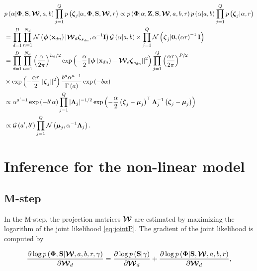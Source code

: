 	\begin{align}
	&p\left(\alpha|\boldsymbol{\Phi},\mathbf{S},\boldsymbol{\mathcal{W}},a,b\right)\prod_{j=1}^{Q}p\left(\boldsymbol{\zeta}_j|\alpha,\boldsymbol{\Phi},\mathbf{S},\boldsymbol{\mathcal{W}},r\right) \propto  p\left(\boldsymbol{\Phi}|\alpha,\boldsymbol{\mathrm{Z}},\mathbf{S},\boldsymbol{\mathcal{W}},a,b,r\right)p\left(\alpha|a,b\right)\prod_{j=1}^{Q}p\left(\boldsymbol{\zeta}_j|\alpha,r\right) \notag\\
	& =  \prod_{d=1}^{D}\prod_{n=1}^{N_d}{\mathcal{N}\left(\boldsymbol{\phi}\left(\mathbf{x}_{dn}\right)|\boldsymbol{\mathcal{W}}_d \boldsymbol{\zeta}_{s_{dn}},\alpha^{-1}\mathbf{I}\right)\mathcal{G}\left(\alpha|a,b\right)} \times \prod_{j=1}^{Q}\mathcal{N}\left(\boldsymbol{\zeta}_j|\mathbf{0},\left(\alpha r\right)^{-1}\mathbf{I}\right) \notag \\
	& = \prod_{d=1}^{D}\prod_{n=1}^{N_d}\left(\frac{\alpha}{2\pi}\right)^{L_d /2}\exp\left(-\frac{\alpha}{2}||\boldsymbol{\phi}\left(\mathbf{x}_{dn}\right)-\boldsymbol{\mathcal{W}}_d\boldsymbol{\zeta}_{s_{dn}}||^2\right) \prod_{j=1}^{Q}\left(\frac{\alpha r}{2\pi}\right)^{P/2} \notag \\
	&\times \exp\left(-\frac{\alpha r}{2}||\boldsymbol{\zeta}_j||^2\right)\frac{b^a \alpha^{a-1}}{\Gamma\left(a\right)}\exp\left(-b\alpha\right) \notag \\
	&\propto \alpha^{a'-1}\exp\left(-b'\alpha\right)\prod_{j=1}^{Q}|\boldsymbol{\Lambda}_j|^{-1/2}\exp\left(-\frac{\alpha}{2}\left(\boldsymbol{\zeta}_j-\boldsymbol{\mu}_j\right)^{\top}\boldsymbol{\Lambda}_j^{-1}\left(\boldsymbol{\zeta}_j-\boldsymbol{\mu}_j\right)\right) \notag \\
	&\propto \mathcal{G}\left(a',b'\right)\prod_{j=1}^{Q}\mathcal{N}\left(\boldsymbol{\mu}_j,\alpha^{-1}\boldsymbol{\Lambda}_j\right).
	\end{align}
	
	
	\section{Inference for the non-linear model}
	
	\subsection{M-step}
	
	In the M-step, the projection matrices $\boldsymbol{\mathcal{W}}$ are estimated by maximizing the logarithm of the joint likelihood \eqref{eq:jointP}. The gradient of the joint likelihood is computed by
	
	\begin{align}
	\frac{\partial \log p\left(\boldsymbol{\Phi},\mathbf{S}|\boldsymbol{\mathcal{W}},a,b,r,\gamma\right)}{\partial\boldsymbol{\mathcal{W}}_d} =
	\frac{\partial \log p\left(\mathbf{S}|\gamma\right)}{\partial\boldsymbol{\mathcal{W}}_d} + \frac{\partial \log p\left(\boldsymbol{\Phi}|\mathbf{S},\boldsymbol{\mathcal{W}},a,b,r\right)}{\partial\boldsymbol{\mathcal{W}}_d},
	\end{align}
	
